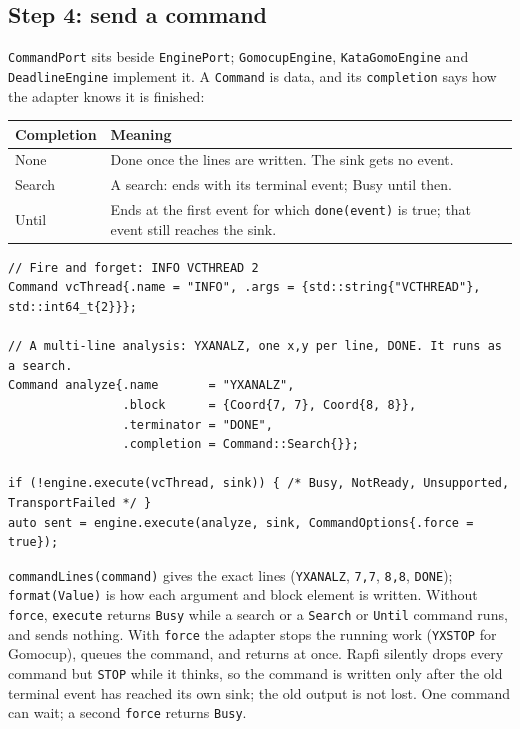 \documentclass[11pt,a4paper]{article}
\newcommand{\code}[1]{\texttt{#1}}
\begin{document}
\subsection{Step 4: send a command}

\code{CommandPort} sits beside \code{EnginePort}; \code{GomocupEngine}, \code{KataGomoEngine} and
\code{DeadlineEngine} implement it. A \code{Command} is data, and its \code{completion} says how
the adapter knows it is finished:

\begin{center}
\small
\begin{tabularx}{\textwidth}{@{}>{\ttfamily}l X@{}}
\toprule
\normalfont\textbf{Completion} & \textbf{Meaning} \\
\midrule
None   & Done once the lines are written. The sink gets no event. \\
Search & A search: ends with its terminal event; Busy until then. \\
Until  & Ends at the first event for which \code{done(event)} is true; that event still reaches
         the sink. \\
\bottomrule
\end{tabularx}
\end{center}

\begin{lstlisting}
// Fire and forget: INFO VCTHREAD 2
Command vcThread{.name = "INFO", .args = {std::string{"VCTHREAD"}, std::int64_t{2}}};

// A multi-line analysis: YXANALZ, one x,y per line, DONE. It runs as a search.
Command analyze{.name       = "YXANALZ",
                .block      = {Coord{7, 7}, Coord{8, 8}},
                .terminator = "DONE",
                .completion = Command::Search{}};

if (!engine.execute(vcThread, sink)) { /* Busy, NotReady, Unsupported, TransportFailed */ }
auto sent = engine.execute(analyze, sink, CommandOptions{.force = true});
\end{lstlisting}

\noindent \code{commandLines(command)} gives the exact lines (\code{YXANALZ}, \code{7,7},
\code{8,8}, \code{DONE}); \code{format(Value)} is how each argument and block element is written.
Without \code{force}, \code{execute} returns \code{Busy} while a search or a \code{Search} or
\code{Until} command runs, and sends nothing. With \code{force} the adapter stops the running work
(\code{YXSTOP} for Gomocup), queues the command, and returns at once. Rapfi silently drops every
command but \code{STOP} while it thinks, so the command is written only after the old terminal
event has reached its own sink; the old output is not lost. One command can wait; a second
\code{force} returns \code{Busy}.
\end{document}
